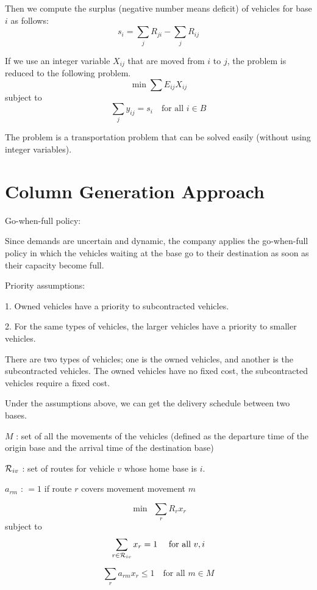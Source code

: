 \documentclass[a4paper]{bxjsarticle}
\begin{document}
Then we compute the surplus  (negative number means deficit) of vehicles for base $i$ as follows:
\[
 s_i =  \sum_{j} R_{ji}  -\sum_{j} R_{ij} 
\]


If we use an integer variable $X_{ij}$ that are moved from $i$ to $j$, 
the problem is reduced to the following problem. 
\[
 \min \sum  E_{ij} X_{ij} 
\]
subject to 
\[
  \sum_{j}  y_{ij} = s_i \ \ \ \mbox{ for  all } i \in B
\]

The problem is a transportation problem that can be solved easily (without using integer variables). 


\section{Column Generation Approach}

Go-when-full policy:

Since demands are uncertain and dynamic, the company applies the go-when-full policy 
in which the vehicles waiting at the base go to their destination as soon as their capacity become full. 

Priority assumptions:

1. Owned vehicles have a priority to subcontracted vehicles.

2. For the same types of vehicles, the larger vehicles have a priority to smaller vehicles. 

There are two types of vehicles; one is the owned vehicles, and another is the subcontracted vehicles. 
The owned vehicles have no fixed cost, the subcontracted vehicles require a fixed cost.


Under the assumptions above, we can get the delivery schedule between two bases. 

$M$ : set of all the movements of the vehicles (defined as the departure time of the origin base and the arrival time of the destination base)

${\cal R}_{iv}$ : set of routes for vehicle $v$ whose home base is $i$.

$a_{rm}$ : $=1$ if route $r$ covers movement movement $m$

\[
 \min \ \ \sum_{r} R_r x_r
\]
subject to 
\[
  \sum_{r \in {\cal R}_{iv} } x_r =1 \ \ \  \mbox{ for all } v,i
\]

\[
 \sum_{r} a_{rm} x_r \leq 1 \ \ \  \mbox{ for all } m \in M
\]
\end{document}

